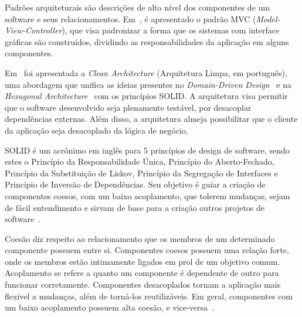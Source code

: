 Padrões arquiteturais são descrições de alto nível dos componentes de um software e seus relacionamentos.
Em~\cite{mvc-paper}, é apresentado o padrão MVC (\emph{Model-View-Controller}), que visa padronizar a forma que os sistemas com interface gráficas são construídos, dividindo as responsabilidades da aplicação em alguns componentes.

Em~\cite{clean-arch-book} foi apresentada a \emph{Clean Architecture} (Arquitetura Limpa, em português), uma abordagem que unifica as ideias presentes no \emph{Domain-Driven Design}~\cite{ddd-book} e na \emph{Hexagonal Architecture}~\cite{hexagonal-arch} com os princípios SOLID\@.
A arquitetura visa permitir que o software desenvolvido seja plenamente testável, por desacoplar dependências externas.
Além disso, a arquitetura almeja possibilitar que o cliente da aplicação seja desacoplado da lógica de negócio.

SOLID é um acrônimo em inglês para 5 princípios de design de software, sendo estes o Princípio da Responsabilidade Única, Princípio do Aberto-Fechado, Princípio da Substituição de Liskov, Princípio da Segregação de Interfaces e Princípio de Inversão de Dependências.
Seu objetivo é guiar a criação de componentes coesos, com um baixo acoplamento, que tolerem mudanças, sejam de fácil entendimento e sirvam de base para a criação outros projetos de software~\cite{clean-arch-book}.

Coesão diz respeito ao relacionamento que os membros de um determinado componente possuem entre si.
Componentes coesos possuem uma relação forte, onde os membros estão intimamente ligados em prol de um objetivo comum.
Acoplamento se refere a quanto um componente é dependente de outro para funcionar corretamente.
Componentes desacoplados tornam a aplicação mais flexível a mudanças, além de torná-los reutilizáveis.
Em geral, componentes com um baixo acoplamento possuem alta coesão, e vice-versa~\cite{coupling-and-cohesion}.